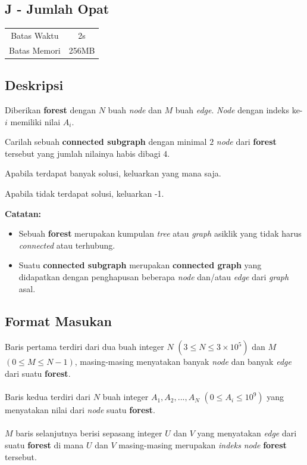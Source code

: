 \documentclass{article}
\begin{document}
\begin{center}
    \section*{J - Jumlah Opat} %

    \begin{tabular}{ | c c | }
        \hline
        Batas Waktu  & 2s \\    %
        Batas Memori & 256MB \\  %
        \hline
    \end{tabular}
\end{center}

\subsection*{Deskripsi}
Diberikan \textbf{forest} dengan $N$ buah \textit{node} dan $M$ buah \textit{edge}. \textit{Node} dengan indeks ke-$i$ memiliki nilai $A_i$.

Carilah sebuah \textbf{connected subgraph} dengan minimal $2$ \textit{node} dari \textbf{forest} tersebut yang jumlah nilainya habis dibagi $4$. 

Apabila terdapat banyak solusi, keluarkan yang mana saja.

Apabila tidak terdapat solusi, keluarkan -1.

\textbf{Catatan:} 
\begin{itemize}
    \setlength\itemsep{0pt}
    \item Sebuah \textbf{forest} merupakan kumpulan \textit{tree} atau \textit{graph} asiklik yang tidak harus \textit{connected} atau terhubung. 
    \item Suatu \textbf{connected subgraph} merupakan \textbf{connected graph} yang didapatkan dengan penghapusan beberapa \textit{node} dan/atau \textit{edge} dari \textit{graph} asal.
\end{itemize}

\subsection*{Format Masukan}

Baris pertama terdiri dari dua buah integer $N$ $(3 \leq N \leq 3\times10^{5})$ dan $M$ $(0 \leq M \leq N-1)$, masing-masing menyatakan banyak \textit{node} dan banyak \textit{edge} dari suatu \textbf{forest}.
\\\\
Baris kedua terdiri dari $N$ buah integer $A_1,A_2,...,A_N$ $(0 \leq A_i \leq 10^9)$ yang menyatakan nilai dari \textit{node} suatu \textbf{forest}.
\\\\
$M$ baris selanjutnya berisi sepasang integer $U$ dan $V$ yang menyatakan \textit{edge} dari suatu \textbf{forest} di mana $U$ dan $V$ masing-masing merupakan \textit{indeks} \textit{node} \textbf{forest} tersebut.
\end{document}

